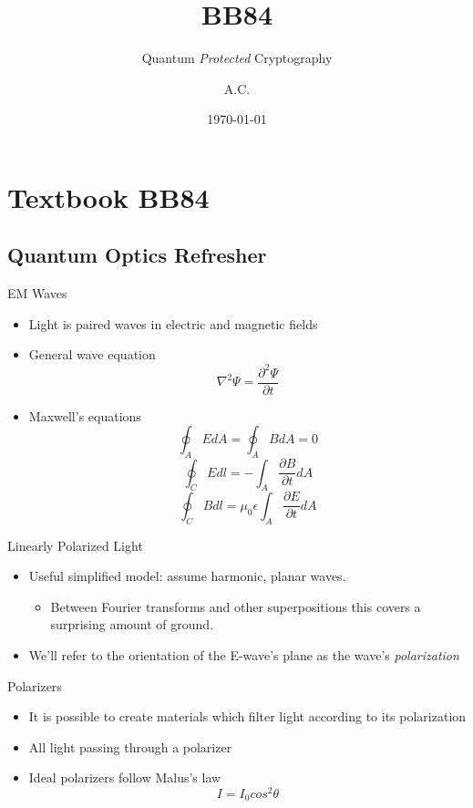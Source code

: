 \documentclass[pdf]{beamer}
\title{BB84}
\subtitle{Quantum \emph{Protected} Cryptography}
\author{A.C.}
\date{\today}
\begin{document}
\begin{frame}
  \titlepage
\end{frame}

\section{Textbook BB84}
\subsection{Quantum Optics Refresher}
\begin{frame}{EM Waves}
  \begin{itemize}
  \item Light is paired waves in electric and magnetic fields
  \item General wave equation \[\nabla^2\Psi = \frac{\partial^2\Psi}{\partial t} \]
  \item Maxwell's equations
    \[ \oint_A E dA = \oint_A B dA = 0 \]
    \[ \oint_C E dl = - \int_A \frac{\partial B}{\partial t} dA\]
    \[ \oint_C B dl = \mu_0 \epsilon \int_A \frac{\partial E}{\partial t} dA \]
  \end{itemize}
\end{frame}
\begin{frame}{Linearly Polarized Light}
  \begin{itemize}
  \item Useful simplified model: assume harmonic, planar waves.
    \begin{itemize}
    \item Between Fourier transforms and other superpositions this covers a
      surprising amount of ground.
    \end{itemize}
  \item We'll refer to the orientation of the E-wave's plane as the wave's \emph{polarization}
  \end{itemize}
\end{frame}
\begin{frame}{Polarizers}
  \begin{itemize}
  \item It is possible to create materials which filter light according to its
    polarization
  \item All light passing through a polarizer
  \item Ideal polarizers follow Malus's law \[ I = I_0 cos^2 \theta \]
  \end{itemize}
\end{frame}
\end{document}
